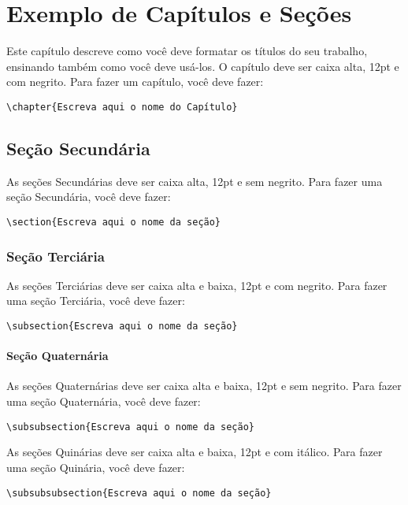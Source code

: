\chapter{Exemplo de Capítulos e Seções}
\label{chap:exemplo-de-capitulos-e-secoes}

Este capítulo descreve como você deve formatar os títulos do seu trabalho, ensinando também como você deve usá-los. O capítulo deve ser caixa alta, 12pt e com negrito. Para fazer um capítulo, você deve fazer:

\verb!\chapter{Escreva aqui o nome do Capítulo}!

\section{Seção Secundária}
As seções Secundárias deve ser caixa alta, 12pt e sem negrito. Para fazer uma seção Secundária, você deve fazer:

\verb!\section{Escreva aqui o nome da seção}!

\subsection{Seção Terciária}
As seções Terciárias deve ser caixa alta e baixa, 12pt e com negrito. Para fazer uma seção Terciária, você deve fazer:

\verb!\subsection{Escreva aqui o nome da seção}!

\subsubsection{Seção Quaternária}
As seções Quaternárias deve ser caixa alta e baixa, 12pt e sem negrito. Para fazer uma seção Quaternária, você deve fazer:

\verb!\subsubsection{Escreva aqui o nome da seção}!

As seções Quinárias deve ser caixa alta e baixa, 12pt e com itálico. Para fazer uma seção Quinária, você deve fazer:

\verb!\subsubsubsection{Escreva aqui o nome da seção}!